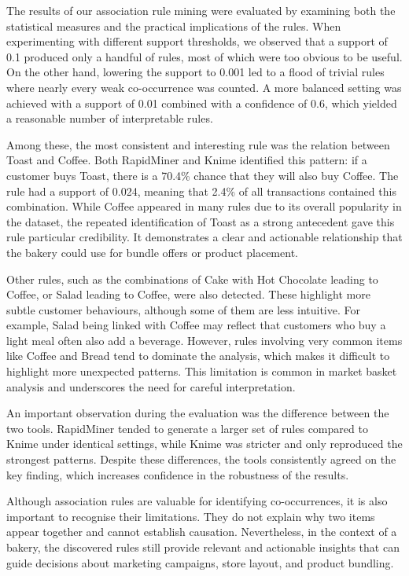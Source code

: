 \label{chap:evaluation}

The results of our association rule mining were evaluated by examining both the statistical 
measures and the practical implications of the rules. When experimenting with different support 
thresholds, we observed that a support of 0.1 produced only a handful of rules, most of which 
were too obvious to be useful. On the other hand, lowering the support to 0.001 led to a flood 
of trivial rules where nearly every weak co-occurrence was counted. A more balanced setting 
was achieved with a support of 0.01 combined with a confidence of 0.6, which yielded a reasonable 
number of interpretable rules.

Among these, the most consistent and interesting rule was the relation between Toast and Coffee. 
Both RapidMiner and Knime identified this pattern: if a customer buys Toast, there is a 
70.4\% chance that they will also buy Coffee. The rule had a support of 0.024, meaning that 
2.4\% of all transactions contained this combination. While Coffee appeared in many rules due to 
its overall popularity in the dataset, the repeated identification of Toast as a strong antecedent 
gave this rule particular credibility. It demonstrates a clear and actionable relationship that 
the bakery could use for bundle offers or product placement.

Other rules, such as the combinations of Cake with Hot Chocolate leading to Coffee, or Salad 
leading to Coffee, were also detected. These highlight more subtle customer behaviours, although 
some of them are less intuitive. For example, Salad being linked with Coffee may reflect that 
customers who buy a light meal often also add a beverage. However, rules involving very common 
items like Coffee and Bread tend to dominate the analysis, which makes it difficult to highlight 
more unexpected patterns. This limitation is common in market basket analysis and underscores 
the need for careful interpretation.

An important observation during the evaluation was the difference between the two tools. RapidMiner 
tended to generate a larger set of rules compared to Knime under identical settings, while 
Knime was stricter and only reproduced the strongest patterns. Despite these differences, the 
tools consistently agreed on the key finding, which increases confidence in the robustness of 
the results.

Although association rules are valuable for identifying co-occurrences, it is also important to 
recognise their limitations. They do not explain why two items appear together and cannot 
establish causation. Nevertheless, in the context of a bakery, the discovered rules still provide 
relevant and actionable insights that can guide decisions about marketing campaigns, store layout, 
and product bundling.

